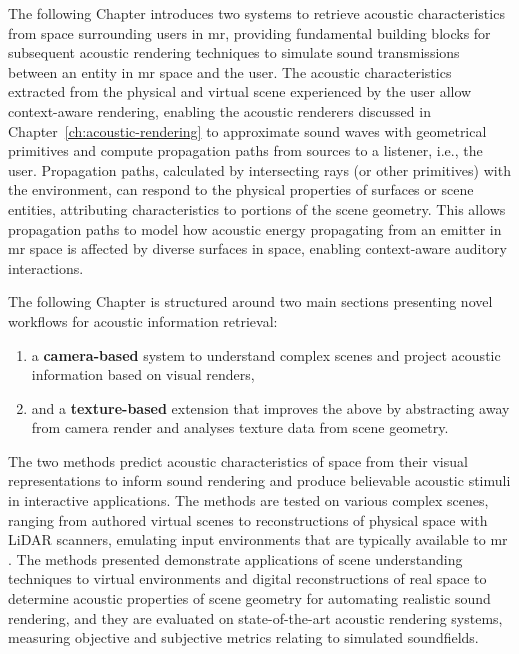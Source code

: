 The following Chapter introduces two systems to retrieve acoustic characteristics from space surrounding users in \acrshort{mr}, providing fundamental building blocks for subsequent acoustic rendering techniques to simulate sound transmissions between an entity in \acrshort{mr} space and the user. The acoustic characteristics extracted from the physical and virtual scene experienced by the user allow context-aware rendering, enabling the acoustic renderers discussed in Chapter~\ref{ch:acoustic-rendering} to approximate sound waves with geometrical primitives and compute propagation paths from sources to a listener, i.e., the user. Propagation paths, calculated by intersecting rays (or other primitives) with the environment, can respond to the physical properties of surfaces or scene entities, attributing characteristics to portions of the scene geometry. This allows propagation paths to model how acoustic energy propagating from an emitter in \acrshort{mr} space is affected by diverse surfaces in space, enabling context-aware auditory interactions.\par
The following Chapter is structured around two main sections presenting novel workflows for acoustic information retrieval:
\begin{enumerate}
    \item a \textbf{camera-based} system to understand complex scenes and project acoustic information based on visual renders,
    \item and a \textbf{texture-based} extension that improves the above by abstracting away from camera render and analyses texture data from scene geometry.
\end{enumerate}
The two methods predict acoustic characteristics of space from their visual representations to inform sound rendering and produce believable acoustic stimuli in interactive applications. The methods are tested on various complex scenes, ranging from authored virtual scenes to reconstructions of physical space with LiDAR scanners, emulating input environments that are typically available to \acrshort{mr} . The methods presented demonstrate applications of scene understanding techniques to virtual environments and digital reconstructions of real space to determine acoustic properties of scene geometry for automating realistic sound rendering, and they are evaluated on state-of-the-art acoustic rendering systems, measuring objective and subjective metrics relating to simulated soundfields.\par

